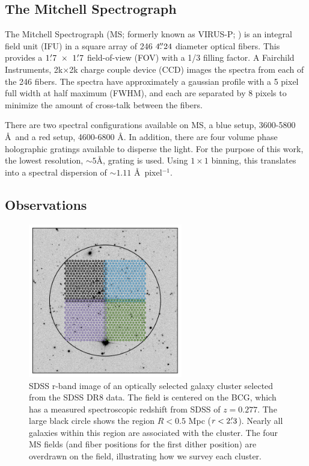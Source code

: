 \subsection{The Mitchell Spectrograph} 
The Mitchell Spectrograph (MS; formerly known as VIRUS-P; \citealt{Hill2008a}) is an integral field unit (IFU) in a square array of 246 $4\mbox{\ensuremath{.\!\!^{\prime\prime}}}24$ diameter optical fibers. This provides a $1\mbox{\ensuremath{.\mkern-4mu^\prime}}7~\times~1\mbox{\ensuremath{.\mkern-4mu^\prime}}7$ field-of-view (FOV) with a 1/3 filling factor. A Fairchild Instruments, 2k$\times$2k charge couple device (CCD) images the spectra from each of the 246 fibers. The spectra have approximately a gaussian profile with a 5 pixel full width at half maximum (FWHM), and each are separated by 8 pixels to minimize the amount of cross-talk between the fibers. 

There are two spectral configurations available on MS, a blue setup, 3600-5800 \AA\ and a red setup, 4600-6800 \AA. In addition, there are four volume phase holographic gratings available to disperse the light. For the purpose of this work, the lowest resolution, $\sim5$\AA, grating is used. Using $1\times1$ binning, this translates into a spectral dispersion of $\sim1.11$ \AA\ pixel$^{-1}$. 

\subsection{Observations} 
\begin{figure}[t]
	\begin{center}
		\includegraphics[width=0.6\textwidth]{./figures2/pointing.pdf} 
	\end{center}
	\caption[Example cluster observations]{SDSS r-band image of an optically selected galaxy cluster selected from the SDSS DR8 data. The field is centered on the BCG, which has a measured spectroscopic redshift from SDSS of $z = 0.277$. The large black circle shows the region $R<0.5$ Mpc ($r<2\mbox{\ensuremath{.\mkern-4mu^\prime}}3$). Nearly all galaxies within this region are associated with the cluster. The four MS fields (and fiber positions for the first dither position) are overdrawn on the field, illustrating how we survey each cluster.} \label{2fig:tiles} 
\end{figure}

